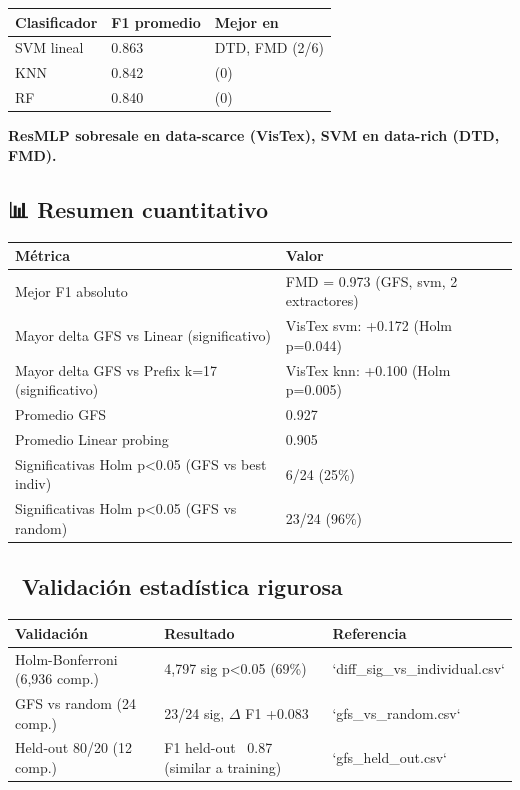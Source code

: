 \begin{table}[h]
\centering
\begin{tabular}{lll}
\toprule
Clasificador & F1 promedio & Mejor en \\
\midrule
SVM lineal & 0.863 & DTD, FMD (2/6) \\
KNN & 0.842 & (0) \\
RF & 0.840 & (0) \\
\bottomrule
\end{tabular}
\end{table}

\textbf{ResMLP sobresale en data-scarce (VisTex), SVM en data-rich (DTD, FMD).}

\hrulefill

\subsection{📊 Resumen cuantitativo}

\begin{table}[h]
\centering
\begin{tabular}{ll}
\toprule
Métrica & Valor \\
\midrule
Mejor F1 absoluto & FMD = 0.973 (GFS, svm, 2 extractores) \\
Mayor delta GFS vs Linear (significativo) & VisTex svm: +0.172 (Holm p=0.044) \\
Mayor delta GFS vs Prefix k=17 (significativo) & VisTex knn: +0.100 (Holm p=0.005) \\
Promedio GFS & 0.927 \\
Promedio Linear probing & 0.905 \\
Significativas Holm p<0.05 (GFS vs best indiv) & 6/24 (25\%) \\
Significativas Holm p<0.05 (GFS vs random) & 23/24 (96\%) \\
\bottomrule
\end{tabular}
\end{table}

\hrulefill

\subsection{🔬 Validación estadística rigurosa}

\begin{table}[h]
\centering
\begin{tabular}{lll}
\toprule
Validación & Resultado & Referencia \\
\midrule
Holm-Bonferroni (6,936 comp.) & 4,797 sig p<0.05 (69\%) & `diff\_sig\_vs\_individual.csv` \\
GFS vs random (24 comp.) & 23/24 sig, $\Delta$ F1 +0.083 & `gfs\_vs\_random.csv` \\
Held-out 80/20 (12 comp.) & F1 held-out ~0.87 (similar a training) & `gfs\_held\_out.csv` \\
\bottomrule
\end{tabular}
\end{table}

